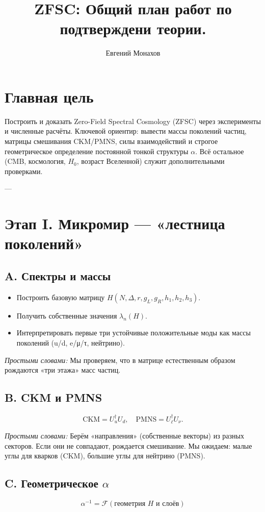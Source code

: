 \documentclass[a4paper,12pt]{article}
\title{ZFSC: Общий план работ по подтверждени теории.}
\author{Евгений Монахов}
\date{}
\begin{document}
\maketitle

\section*{Главная цель}
Построить и доказать Zero-Field Spectral Cosmology (ZFSC) через эксперименты и численные расчёты.  
Ключевой ориентир: вывести массы поколений частиц, матрицы смешивания CKM/PMNS, силы взаимодействий и строгое геометрическое определение постоянной тонкой структуры $\alpha$.  
Всё остальное (CMB, космология, $H_0$, возраст Вселенной) служит дополнительными проверками.

---

\section*{Этап I. Микромир — «лестница поколений»}
\subsection*{A. Спектры и массы}
\begin{itemize}
  \item Построить базовую матрицу $H(N, \Delta, r, g_L, g_R, h_1,h_2,h_3)$.
  \item Получить собственные значения $\lambda_n(H)$.
  \item Интерпретировать первые три устойчивые положительные моды как массы поколений (u/d, e/μ/τ, нейтрино).
\end{itemize}

\textit{Простыми словами:}  
Мы проверяем, что в матрице естественным образом рождаются «три этажа» масс частиц.

\subsection*{B. CKM и PMNS}
\[
\mathrm{CKM} = U_u^\dagger U_d, 
\quad
\mathrm{PMNS} = U_\ell^\dagger U_\nu .
\]

\textit{Простыми словами:}  
Берём «направления» (собственные векторы) из разных секторов.  
Если они не совпадают, рождается смешивание. Мы ожидаем:
малые углы для кварков (CKM), большие углы для нейтрино (PMNS).

\subsection*{C. Геометрическое $\alpha$}
\[
\alpha^{-1} = \mathcal{F}(\text{геометрия $H$ и слоёв})
\]
\end{document}
